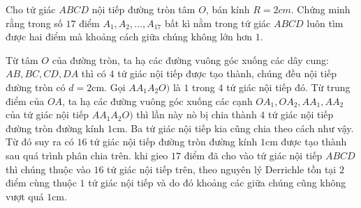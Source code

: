 \begin{ex}%
Cho tứ giác $ABCD$ nội tiếp đường tròn tâm $O$, bán kính $R=2cm$. Chứng minh rằng trong số $17$ điểm $A_1,A_2,...,A_17$ bất kì nằm trong tứ giác $ABCD$ luôn tìm được hai điểm mà khoảng cách giữa chúng không lớn hơn $1$.
\loigiai
    {
\begin{center}
\end{center}
Từ tâm $O$ của đường tròn, ta hạ các đường vuông góc xuống các dây cung: $AB,BC,CD,DA$ thì có $4$ tứ giác nội tiếp được tạo thành, chúng đều nội tiếp đường tròn có $d=2$cm. Gọi $AA_{1}A_{2}O)$ là $1$ trong $4$ tứ giác nội tiếp đó. Từ trung điểm của $OA$, ta hạ các đường vuông góc xuống các cạnh $OA_{1},OA_{2},AA_{1},AA_{2}$ của tứ giác nội tiếp $AA_{1}A_{2}O)$ thì lần này nò bị chia thành $4$ tứ giác nội tiếp đường tròn đường kính $1$cm. Ba tứ giác nội tiếp kia cũng chia theo cách như vậy. Từ đó suy ra có $16$ tứ giác nội tiếp đường tròn đường kính $1$cm được tạo thành sau quá trình phân chia trên. khi gieo $17$ điểm đã cho vào tứ giác nội tiếp  $ABCD$ thì chúng thuộc vào $16$ tứ giác nội tiếp trên, theo nguyên lý Derrichle tồn tại $2$ điểm cùng thuộc $1$ tứ giác nội tiếp và do đó khoảng các giữa chúng cũng không vượt quá $1$cm.
    }
\end{ex}

